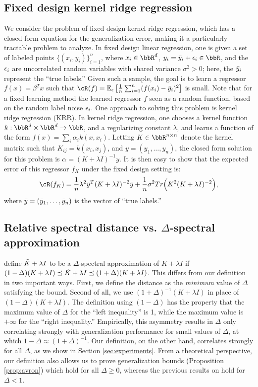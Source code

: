 \subsection{Fixed design kernel ridge regression}
\label{subsec:app_fix_design}
We consider the problem of fixed design kernel ridge regression, which has a closed form equation for the generalization error, making it a particularly tractable problem to analyze. In fixed design linear regression, one is given a set of labeled points $\{(x_i,y_i)\}_{i=1}^n$, where $x_i \in \RR^d$, $y_i = \by_i + \eps_i \in \RR$, and the $\epsilon_i$ are uncorrelated random variables with shared variance $\sigma^2 > 0$; here, the $\bar{y}_i$ represent the ``true labels.'' Given such a sample, the goal is to learn a regressor $f(x) = \beta^T x$ such that $\cR(f) = \expect{\eps}{\frac{1}{n}\sum_{i=1}^n (f(x_i) - \by_i)^2}$ is small. Note that for a fixed learning method the learned regressor $f$ seen as a random function, based on the random label noise $\epsilon_i$.  One approach to solving this problem is kernel ridge regression (KRR).  In kernel ridge regression, one chooses a kernel function $k:\RR^d\times\RR^d\rightarrow \RR$, and a regularizing constant $\lambda$, and learns a function of the form $f(x) = \sum_i \alpha_i k(x,x_i)$.  Letting $K\in\RR^{n\times n}$ denote the kernel matrix such that $K_{ij} = k(x_i,x_j)$, and $y = (y_1,\ldots,y_n)$, the closed form solution for this problem is $\alpha = (K+\lambda I)^{-1}y$. It is then easy to show \citep{alaoui15} that the expected error of this regressor $f_K$ under the fixed design setting is:
\begin{eqnarray}
\cR(f_K) = \frac{1}{n}\lambda^2 \by^T(K+\lambda I)^{-2}\by + \frac{1}{n}\sigma^2 Tr\Big(K^2(K+\lambda \id)^{-2}\Big),
\end{eqnarray}
where $\bar{y} = (\bar{y}_1,\ldots,\bar{y}_n)$ is the vector of ``true labels.''


\subsection{Relative spectral distance vs. $\Delta$-spectral approximation}
\label{subsec:app_def_diff}
\citet{avron17} define $\tilde{K}+\lambda I$ to be a $\Delta$-spectral approximation of $K+\lambda I$ if $(1-\Delta)(K+\lambda I) \preceq \tilde{K} + \lambda I \preceq (1+\Delta)(K+\lambda I)$. This differs from our definition in two important ways. First, we define the distance as the \textit{minimum} value of $\Delta$ satisfying the bound.  Second of all, we use $(1+\Delta)^{-1}(K+\lambda I)$ in place of $(1-\Delta)(K+\lambda I)$. The definition using $(1-\Delta)$ has the property that the maximum value of $\Delta$ for the ``left inequality'' is 1, while the maximum value is $+\infty$ for the ``right inequality.'' Empirically, this asymmetry results in $\Delta$ only correlating strongly with generalization performance for small values of $\Delta$, at which $1-\Delta\approx (1+\Delta)^{-1}$. Our definition, on the other hand, correlates strongly for all $\Delta$, as we show in Section \ref{sec:experiments}.  From a theoretical perspective, our definition also allows us to prove generalization bounds (Proposition \ref{prop:avron}) which hold for all $\Delta \geq 0$, whereas the previous results on hold for $\Delta < 1$.


